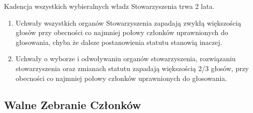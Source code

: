 \documentclass{article}
\begin{document}
Kadencja wszystkich wybieralnych władz Stowarzyszenia trwa 2 lata.

\begin{enumerate}
\item
  Uchwały wszystkich organów Stowarzyszenia zapadają zwykłą większością głosów przy obecności co najmniej połowy członków uprawnionych do głosowania, chyba że dalsze postanowienia statutu stanowią inaczej.
\item
  Uchwały o wyborze i odwoływaniu organów stowarzyszenia, rozwiązaniu stowarzyszenia oraz zmianach statutu zapadają większością 2/3 głosów, przy obecności co najmniej połowy członków uprawnionych do głosowania.
\end{enumerate}

\subsection*{Walne Zebranie Członków}
\end{document}

